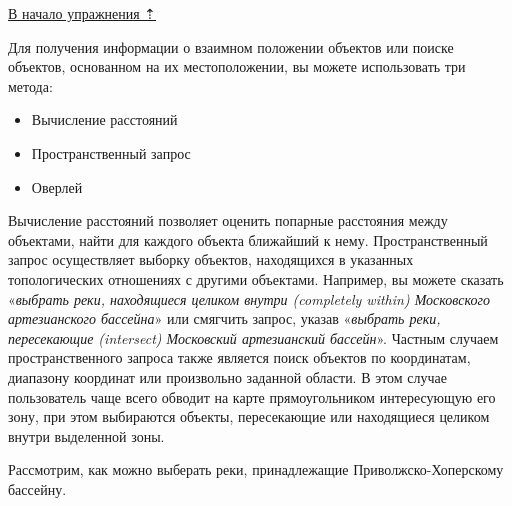 \documentclass[12pt,]{book}
\providecommand{\tightlist}{%
  \setlength{\itemsep}{0pt}\setlength{\parskip}{0pt}}
\begin{document}
\protect\hyperlink{map-ref-hydrogeologic}{В начало упражнения ⇡}

Для получения информации о взаимном положении объектов или поиске объектов, основанном на их местоположении, вы можете использовать три метода:

\begin{itemize}
\tightlist
\item
  Вычисление расстояний
\item
  Пространственный запрос
\item
  Оверлей
\end{itemize}

Вычисление расстояний позволяет оценить попарные расстояния между объектами, найти для каждого объекта ближайший к нему. Пространственный запрос осуществляет выборку объектов, находящихся в указанных топологических отношениях с другими объектами. Например, вы можете сказать «\emph{выбрать реки, находящиеся целиком внутри (completely within) Московского артезианского бассейна}» или смягчить запрос, указав «\emph{выбрать реки, пересекающие (intersect) Московский артезианский бассейн}». Частным случаем пространственного запроса также является поиск объектов по координатам, диапазону координат или произвольно заданной области. В этом случае пользователь чаще всего обводит на карте прямоугольником интересующую его зону, при этом выбираются объекты, пересекающие или находящиеся целиком внутри выделенной зоны.

Рассмотрим, как можно выберать реки, принадлежащие Приволжско-Хоперскому бассейну.
\end{document}
